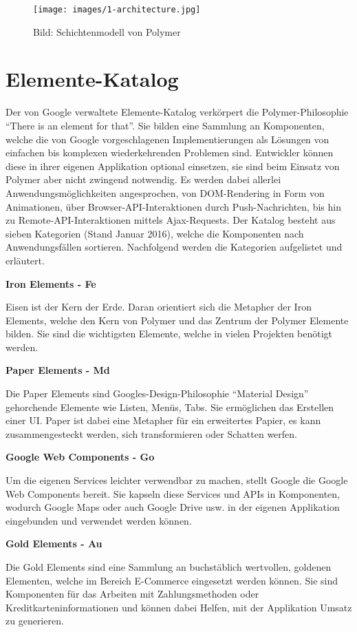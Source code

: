 \begin{figure}[htbp]
\centering
\texttt{[image: images/1-architecture.jpg]}
\caption{Bild: Schichtenmodell von Polymer}
\end{figure}

\section{Elemente-Katalog}\label{elemente-katalog}

Der von Google verwaltete Elemente-Katalog verkörpert die
Polymer-Philosophie ``There is an element for that''. Sie bilden eine
Sammlung an Komponenten, welche die von Google vorgeschlagenen
Implementierungen als Lösungen von einfachen bis komplexen
wiederkehrenden Problemen sind. Entwickler können diese in ihrer eigenen
Applikation optional einsetzen, sie sind beim Einsatz von Polymer aber
nicht zwingend notwendig. Es werden dabei allerlei
Anwendungsmöglichkeiten angesprochen, von DOM-Rendering in Form von
Animationen, über Browser-API-Interaktionen durch Push-Nachrichten, bis
hin zu Remote-API-Interaktionen mittels Ajax-Requests. Der Katalog
besteht aus sieben Kategorien (Stand Januar 2016), welche die
Komponenten nach Anwendungsfällen sortieren. Nachfolgend werden die
Kategorien aufgelistet und erläutert.

\textbf{Iron Elements - Fe}

Eisen ist der Kern der Erde. Daran orientiert sich die Metapher der Iron
Elements, welche den Kern von Polymer und das Zentrum der Polymer
Elemente bilden. Sie sind die wichtigsten Elemente, welche in vielen
Projekten benötigt werden.

\textbf{Paper Elements - Md}

Die Paper Elements sind Googles-Design-Philosophie ``Material Design''
gehorchende Elemente wie Listen, Menüs, Tabs. Sie ermöglichen das
Erstellen einer UI. Paper ist dabei eine Metapher für ein erweitertes
Papier, es kann zusammengesteckt werden, sich transformieren oder
Schatten werfen.

\textbf{Google Web Components - Go}

Um die eigenen Services leichter verwendbar zu machen, stellt Google die
Google Web Components bereit. Sie kapseln diese Services und APIs in
Komponenten, wodurch Google Maps oder auch Google Drive usw. in der
eigenen Applikation eingebunden und verwendet werden können.

\textbf{Gold Elements - Au}

Die Gold Elements sind eine Sammlung an buchstäblich wertvollen,
goldenen Elementen, welche im Bereich E-Commerce eingesetzt werden
können. Sie sind Komponenten für das Arbeiten mit Zahlungsmethoden oder
Kreditkarteninformationen und können dabei Helfen, mit der Applikation
Umsatz zu generieren.

